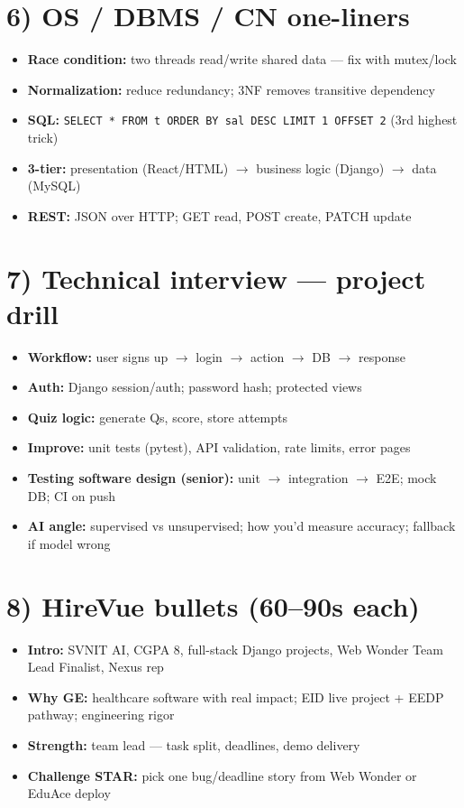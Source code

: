\documentclass[a4paper,9pt]{extarticle}
\begin{document}
\section{6) OS / DBMS / CN one-liners}
\begin{itemize}
  \item \textbf{Race condition:} two threads read/write shared data --- fix with mutex/lock
  \item \textbf{Normalization:} reduce redundancy; 3NF removes transitive dependency
  \item \textbf{SQL:} \texttt{SELECT * FROM t ORDER BY sal DESC LIMIT 1 OFFSET 2} (3rd highest trick)
  \item \textbf{3-tier:} presentation (React/HTML) $\rightarrow$ business logic (Django) $\rightarrow$ data (MySQL)
  \item \textbf{REST:} JSON over HTTP; GET read, POST create, PATCH update
\end{itemize}

\section{7) Technical interview --- project drill}
\begin{itemize}
  \item \textbf{Workflow:} user signs up $\rightarrow$ login $\rightarrow$ action $\rightarrow$ DB $\rightarrow$ response
  \item \textbf{Auth:} Django session/auth; password hash; protected views
  \item \textbf{Quiz logic:} generate Qs, score, store attempts
  \item \textbf{Improve:} unit tests (pytest), API validation, rate limits, error pages
  \item \textbf{Testing software design (senior):} unit $\rightarrow$ integration $\rightarrow$ E2E; mock DB; CI on push
  \item \textbf{AI angle:} supervised vs unsupervised; how you'd measure accuracy; fallback if model wrong
\end{itemize}

\section{8) HireVue bullets (60--90s each)}
\begin{itemize}
  \item \textbf{Intro:} SVNIT AI, CGPA 8, full-stack Django projects, Web Wonder Team Lead Finalist, Nexus rep
  \item \textbf{Why GE:} healthcare software with real impact; EID live project + EEDP pathway; engineering rigor
  \item \textbf{Strength:} team lead --- task split, deadlines, demo delivery
  \item \textbf{Challenge STAR:} pick one bug/deadline story from Web Wonder or EduAce deploy
\end{itemize}
\end{document}
